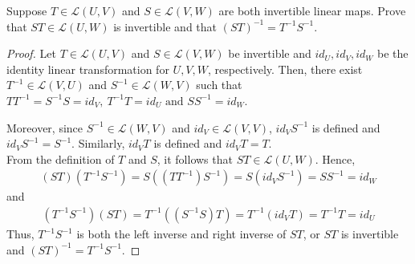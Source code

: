 \begin{question}
	\normalfont
	
	Suppose $T \in \mathcal{L}(U,V)$ and $S \in \mathcal{L}(V,W)$ are both invertible linear maps. Prove that $ST \in \mathcal{L}(U,W)$ is invertible and that $(ST)^{-1} = T^{-1}S^{-1}$. 
	
	
	\end{question}
\begin{proof}
    \renewcommand{\qedsymbol}{$\blacksquare$}
    Let $T\in\mathcal{L}(U,V)$ and $S\in\mathcal{L}(V,W)$ be invertible and $id_U,id_V,id_W$ be the identity linear transformation for $U,V,W$, respectively.
    Then, there exist $T^{-1}\in\mathcal{L}(V,U)$ and $S^{-1}\in\mathcal{L}(W,V)$ such that $TT^{-1}=S^{-1}S=id_V, \ T^{-1}T=id_U \text{ and } SS^{-1}=id_W$.

    Moreover, since $S^{-1}\in\mathcal{L}(W,V)$ and $id_V\in\mathcal{L}(V,V)$, $id_V S^{-1}$ is defined and $id_V S^{-1}=S^{-1}$.
    Similarly, $id_V T$ is defined and $id_V T=T$.\\
    From the definition of $T$ and $S$, it follows that $ST\in\mathcal{L}(U,W)$. Hence,
    \[
        \begin{aligned}
            (ST)(T^{-1}S^{-1})
            = S((TT^{-1})S^{-1})
            = S(id_VS^{-1})
            = SS^{-1}=id_W
        \end{aligned}
    \]
    and 
    \[
        \begin{aligned}
            (T^{-1}S^{-1})(ST)
            = T^{-1}((S^{-1}S)T)
            = T^{-1}(id_VT)
            = T^{-1}T=id_U
        \end{aligned}
    \]
    Thus, $T^{-1}S^{-1}$ is both the left inverse and right inverse of $ST$, or $ST$ is invertible and $(ST)^{-1}=T^{-1}S^{-1}$.
\end{proof}